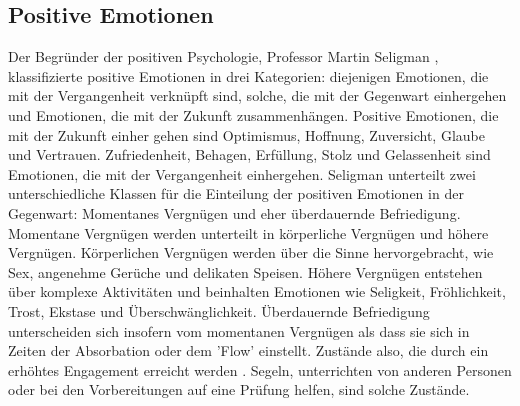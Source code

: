 \subsection{Positive Emotionen}\label{subsec.swbPosEmotion}
Der Begründer der positiven Psychologie, Professor Martin Seligman \citeyear{Seligman:2002}, klassifizierte positive Emotionen in drei Kategorien: diejenigen Emotionen, die mit der Vergangenheit verknüpft sind, solche, die mit der Gegenwart einhergehen und Emotionen, die mit der Zukunft zusammenhängen. Positive Emotionen, die mit der Zukunft einher gehen sind Optimismus, Hoffnung, Zuversicht, Glaube und Vertrauen. Zufriedenheit, Behagen, Erfüllung, Stolz und Gelassenheit sind Emotionen, die mit der Vergangenheit einhergehen. Seligman unterteilt zwei unterschiedliche Klassen für die Einteilung der positiven Emotionen in der Gegenwart: Momentanes Vergnügen und eher überdauernde Befriedigung. Momentane Vergnügen werden unterteilt in körperliche Vergnügen und höhere Vergnügen. Körperlichen Vergnügen werden über die Sinne hervorgebracht, wie Sex, angenehme Gerüche und delikaten Speisen.  Höhere Vergnügen entstehen über komplexe Aktivitäten und beinhalten Emotionen wie Seligkeit, Fröhlichkeit, Trost, Ekstase und Überschwänglichkeit. Überdauernde Befriedigung unterscheiden sich insofern vom momentanen Vergnügen als dass sie sich in Zeiten der Absorbation oder dem 'Flow' einstellt. Zustände also, die durch ein erhöhtes Engagement erreicht werden \cite{Carr:2011}. Segeln, unterrichten von anderen Personen oder bei den Vorbereitungen auf eine Prüfung helfen, sind solche Zustände. 

